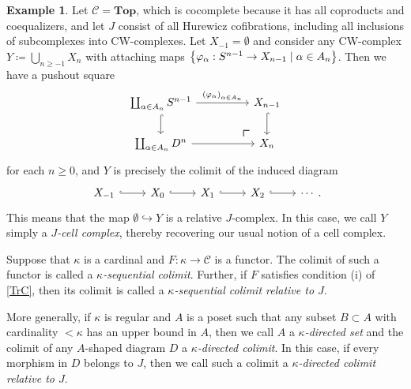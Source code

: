 \documentclass[10pt,letterpaper,cm]{nupset}
\theoremstyle{definition}
\newtheorem{exmp}[definition]{Example}
\theoremstyle{theorem}
\theoremstyle{remark}
\newcommand{\0}{\mathbf{0}}
\newcommand{\1}{\mathbf{1}}
\newcommand{\2}{\mathbf{2}}
\renewcommand{\c}{\mathscr{C}}
\begin{document}
\begin{exmp}
Let $\c = \mathbf{Top}$, which is cocomplete because it has all coproducts and coequalizers, and let $J$ consist of all Hurewicz cofibrations, including all inclusions of subcomplexes into CW-complexes.  Let $X_{{-1}} = \emptyset$ and consider any CW-complex $Y\coloneqq \bigcup_{n\geq {-1}}X_n$ with attaching maps $\mleft\{\varphi_{\alpha} : S^{n-1} \to X_{n-1} \mid \alpha \in A_n\mright\}$. Then we have a pushout square
\[
\begin{tikzcd}[column sep=huge]
\coprod_{\alpha \in A_n}S^{n-1} \arrow[d, hook]
 \arrow[dr, phantom, "\scalebox{1.5}{\color{black}$\ulcorner$}", very near end, color=black]
  \arrow[r, "\mleft(\varphi_{\alpha}\mright)_{\alpha \in A_n}"] & X_{n-1} \arrow[d, hook] \\
\coprod_{\alpha \in A_n}D^n \arrow[r]                                                                         & X_n                    
\end{tikzcd}
\] for each $n\geq 0$, and $Y$ is precisely the colimit of the induced diagram
\[
\begin{tikzcd}
X_{{-1}} \arrow[r, hook] & X_0 \arrow[r, hook] & X_1 \arrow[r, hook] & X_2 \arrow[r, hook] & \cdots
\end{tikzcd}.
\] This means that the map $\emptyset \hookrightarrow Y$ is a relative $J$-complex. In this case, we call $Y$ simply a \textit{$J$-cell complex}, thereby recovering our usual notion of a cell complex. 
\end{exmp}

\smallskip

Suppose that $\kappa$ is a cardinal and $F: \kappa \to \c$ is a functor. The colimit of such a functor is called a \textit{$\kappa$-sequential colimit}. Further, if $F$ satisfies condition (i) of \cref{TrC}, then its colimit is called a \textit{$\kappa$-sequential colimit relative to $J$}.

\medskip

More generally, if $\kappa$ is regular and $A$ is a poset such that any subset $B \subset A$ with cardinality $< \kappa$ has an upper bound in $A$, then we call $A$ a \textit{$\kappa$-directed set} and the colimit of any $A$-shaped diagram $D$ a \textit{$\kappa$-directed colimit}. In this case, if every morphism in $D$ belongs to $J$, then we call such a colimit a \textit{$\kappa$-directed colimit relative to $J$}.
\end{document}
